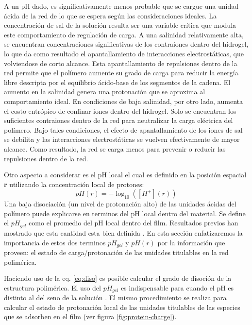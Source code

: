 A un pH dado, es significativamente menos probable que se cargue una unidad \'acida de la red de lo que se espera seg\'un las consideraciones ideales. La concentraci\'on de sal de la soluci\'on resulta ser una variable cr\'itica que modula este comportamiento de regulación de carga. A una salinidad relativamente alta, se encuentran concentraciones significativas de los contraiones dentro del hidrogel, lo que da como resultado el apantallamiento de interacciones electrost\'aticas, que volviendose de corto alcance. Esta apantallamiento de repulsiones dentro de la red permite que el pol\'imero aumente su grado de carga para reducir la energ\'ia libre descripta por el equilibrio \'acido-base de los segmentos de la cadena. El aumento en la salinidad genera una protonaci\'on que se aproxima al comportamiento ideal. En condiciones de baja salinidad, por otro lado, aumenta el costo entr\'opico de confinar iones dentro del hidrogel. Solo se encuentran los suficientes contraiones dentro de la red para neutralizar la carga el\'ectrica del pol\'imero. Bajo tales condiciones, el efecto de apantallamiento de los iones de sal se debilita y las interacciones electrost\'aticas se vuelven efectivamente de mayor alcance. Como resultado, la red se carga menos para prevenir o reducir las repulsiones dentro de la red.

Otro aspecto a considerar es el pH local el cual es definido en la posición espacial \textbf{r}  utilizando la concentraci\'on local de protones:
\begin{equation}
    pH(r) = -\log_{10}([H^+](r))
    \label{eq:pH-local}
\end{equation}
Una baja disociaci\'on (un nivel de protonaci\'on alto) de las unidades \'acidas del pol\'imero puede explicarse en terminos del pH local dentro del material. Se define el $pH_{gel}$ como el promedio del pH local dentro del film. Resultados previos han mostrado que esta cantidad esta bien definida \addcite. En esta secci\'on enfatizaremos la importancia de estos dos terminos $pH_{gel}$ y $pH(r)$ por la informaci\'on que proveen: el estado de carga/protonaci\'on de las unidades titulables en la red polim\'erica. 

Haciendo uso de la eq. \ref{eq:diso} es posible calcular el grado de disoci\'on de la estructura polim\'erica. El uso del $pH_{gel}$ es indispensable para cuando el pH es distinto al  del seno de la soluci\'on \addcite. El mismo procedimiento se realiza para calcular el estado de protonaci\'on local de las unidades titulables de las especies que se adsorben en el film (ver figura \ref{fig:protein-charge}).


